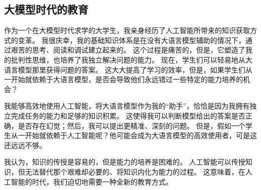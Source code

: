 \documentclass[12pt, a4paper]{article}
\begin{document}
\subsection{大模型时代的教育}

作为一个在大模型时代求学的大学生，我亲身经历了人工智能所带来的知识获取方式的变革。
我很庆幸，我的基础知识体系是在没有大语言模型辅助的情况下，通过艰苦的思考、阅读和调试建立起来的。
这个过程是痛苦的，但是，它塑造了我的批判性思维，也培养了我独立解决问题的能力。
现在，学生们可以轻易地从大语言模型那里获得问题的答案。
这大大提高了学习的效率，但是，如果学生们从一开始就依赖于大语言模型，是否会导致他们永远错过一些特定的能力培养的机会？

我能够高效地使用人工智能，将大语言模型作为我的“助手”，恰恰是因为我拥有独立完成任务的能力和足够的知识积累。
这使得我可以判断模型给出的答案是否正确，是否存在幻觉；然后，我可以提出更精准、深刻的问题。
但是，假如一个学生从一开始就依赖于人工智能呢？他可能会成为大语言模型的高效使用者，可是这还远远不够。

我认为，知识的传授是容易的，但是能力的培养是困难的。
人工智能可以传授知识，但无法替代那个艰难却必要的、将知识内化为能力的过程。
这意味着，在人工智能的时代，我们迫切地需要一种全新的教育方式。
\end{document}
